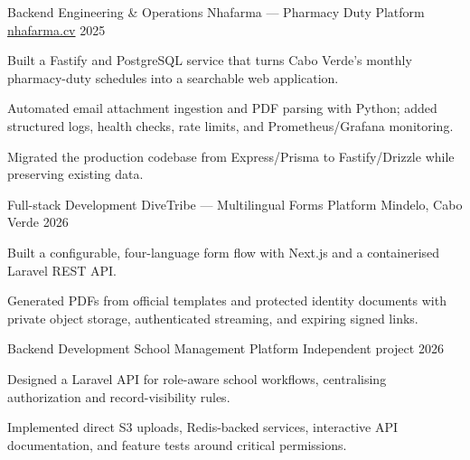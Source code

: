 
\begin{cventries}
  \cventry
    {Backend Engineering \& Operations}
    {Nhafarma — Pharmacy Duty Platform}
    {\href{https://nhafarma.cv}{nhafarma.cv}}
    {2025}
    {
      \begin{cvitems}
        \item {Built a Fastify and PostgreSQL service that turns Cabo Verde's monthly pharmacy-duty schedules into a searchable web application.}
        \item {Automated email attachment ingestion and PDF parsing with Python; added structured logs, health checks, rate limits, and Prometheus/Grafana monitoring.}
        \item {Migrated the production codebase from Express/Prisma to Fastify/Drizzle while preserving existing data.}
      \end{cvitems}
    }

  \cventry
    {Full-stack Development}
    {DiveTribe — Multilingual Forms Platform}
    {Mindelo, Cabo Verde}
    {2026}
    {
      \begin{cvitems}
        \item {Built a configurable, four-language form flow with Next.js and a containerised Laravel REST API.}
        \item {Generated PDFs from official templates and protected identity documents with private object storage, authenticated streaming, and expiring signed links.}
      \end{cvitems}
    }

  \cventry
    {Backend Development}
    {School Management Platform}
    {Independent project}
    {2026}
    {
      \begin{cvitems}
        \item {Designed a Laravel API for role-aware school workflows, centralising authorization and record-visibility rules.}
        \item {Implemented direct S3 uploads, Redis-backed services, interactive API documentation, and feature tests around critical permissions.}
      \end{cvitems}
    }
\end{cventries}
